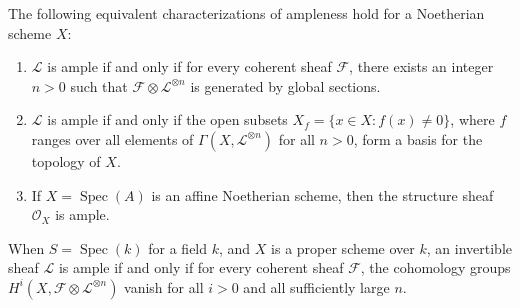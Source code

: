 \begin{definition}
The following equivalent characterizations of ampleness hold for a Noetherian scheme $X$:
\begin{enumerate}
    \item $\mathcal{L}$ is ample if and only if for every coherent sheaf $\mathcal{F}$, there exists an integer $n > 0$ such that $\mathcal{F} \otimes \mathcal{L}^{\otimes n}$ is generated by global sections.
    \item $\mathcal{L}$ is ample if and only if the open subsets $X_f = \{x \in X : f(x) \neq 0\}$, where $f$ ranges over all elements of $\Gamma(X, \mathcal{L}^{\otimes n})$ for all $n > 0$, form a basis for the topology of $X$.
    \item If $X = \operatorname{Spec}(A)$ is an affine Noetherian scheme, then the structure sheaf $\mathcal{O}_X$ is ample.
\end{enumerate}

When $S = \operatorname{Spec}(k)$ for a field $k$, and $X$ is a proper scheme over $k$, an invertible sheaf $\mathcal{L}$ is ample if and only if for every coherent sheaf $\mathcal{F}$, the cohomology groups $H^i(X, \mathcal{F} \otimes \mathcal{L}^{\otimes n})$ vanish for all $i > 0$ and all sufficiently large $n$.
\end{definition}

